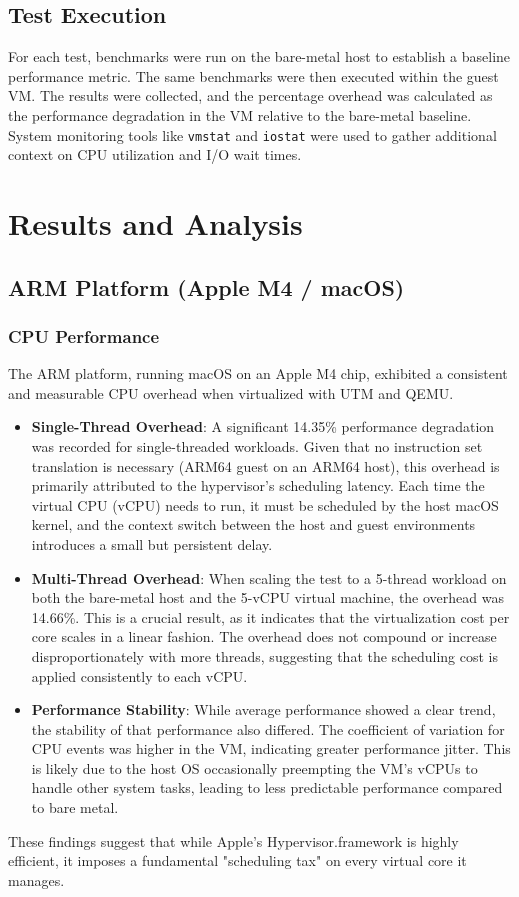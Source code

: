 \documentclass[conference]{IEEEtran}
\begin{document}
\subsection{Test Execution}
For each test, benchmarks were run on the bare-metal host to establish a baseline performance metric. The same benchmarks were then executed within the guest VM. The results were collected, and the percentage overhead was calculated as the performance degradation in the VM relative to the bare-metal baseline. System monitoring tools like \texttt{vmstat} and \texttt{iostat} were used to gather additional context on CPU utilization and I/O wait times.

\section{Results and Analysis}

\subsection{ARM Platform (Apple M4 / macOS)}

\subsubsection{CPU Performance}
The ARM platform, running macOS on an Apple M4 chip, exhibited a consistent and measurable CPU overhead when virtualized with UTM and QEMU.
\begin{itemize}
    \item \textbf{Single-Thread Overhead}: A significant 14.35\% performance degradation was recorded for single-threaded workloads. Given that no instruction set translation is necessary (ARM64 guest on an ARM64 host), this overhead is primarily attributed to the hypervisor's scheduling latency. Each time the virtual CPU (vCPU) needs to run, it must be scheduled by the host macOS kernel, and the context switch between the host and guest environments introduces a small but persistent delay.
    \item \textbf{Multi-Thread Overhead}: When scaling the test to a 5-thread workload on both the bare-metal host and the 5-vCPU virtual machine, the overhead was 14.66\%. This is a crucial result, as it indicates that the virtualization cost per core scales in a linear fashion. The overhead does not compound or increase disproportionately with more threads, suggesting that the scheduling cost is applied consistently to each vCPU.
    \item \textbf{Performance Stability}: While average performance showed a clear trend, the stability of that performance also differed. The coefficient of variation for CPU events was higher in the VM, indicating greater performance jitter. This is likely due to the host OS occasionally preempting the VM's vCPUs to handle other system tasks, leading to less predictable performance compared to bare metal.
\end{itemize}
These findings suggest that while Apple's Hypervisor.framework is highly efficient, it imposes a fundamental "scheduling tax" on every virtual core it manages.
\end{document}
